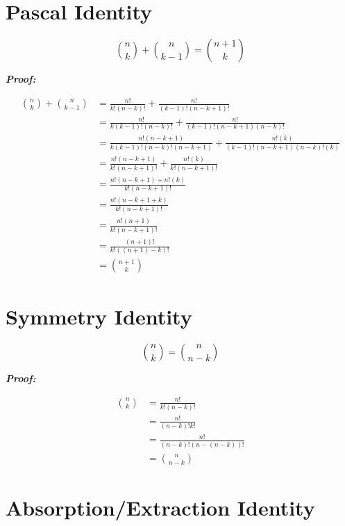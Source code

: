 \documentclass{article}
\begin{document}
\newpage
\section{Pascal Identity}

\[
    \binom{n}{k} + \binom{n}{k - 1} = \binom{n+1}{k}
\]

\textbf{\textit{Proof:}}

\begin{align*}
    \binom{n}{k} + \binom{n}{k-1} &= \frac{n!}{k!(n-k)!} + \frac{n!}{(k-1)!(n-k+1)!} \\
                                  &= \frac{n!}{k(k-1)!(n-k)!} + \frac{n!}{(k-1)!(n-k+1)(n-k)!} \\
                                  &= \frac{n!(n-k+1)}{k(k-1)!(n-k)!(n-k+1)} + \frac{n!(k)}{(k-1)!(n-k+1)(n-k)!(k)} \\
                                  &= \frac{n!(n-k+1)}{k!(n-k+1)!} + \frac{n!(k)}{k!(n-k+1)!} \\
                                  &= \frac{n!(n-k+1) + n!(k)}{k!(n-k+1)!} \\
                                  &= \frac{n!(n-k+1+k)}{k!(n-k+1)!} \\
                                  &= \frac{n!(n+1)}{k!(n-k+1)!} \\
                                  &= \frac{(n+1)!}{k!((n+1)-k)!} \\
                                  &= \binom{n+1}{k}
\end{align*}


\section{Symmetry Identity}

\[
    \binom{n}{k} = \binom{n}{n-k}
\]

\textbf{\textit{Proof:}}

\begin{align*}
    \binom{n}{k} &= \frac{n!}{k!(n-k)!} \\
                 &= \frac{n!}{(n-k)!k!} \\
                 &= \frac{n!}{(n-k)!(n-(n-k))!} \\
                 &= \binom{n}{n-k}
\end{align*}


\section{Absorption/Extraction Identity}
\end{document}

